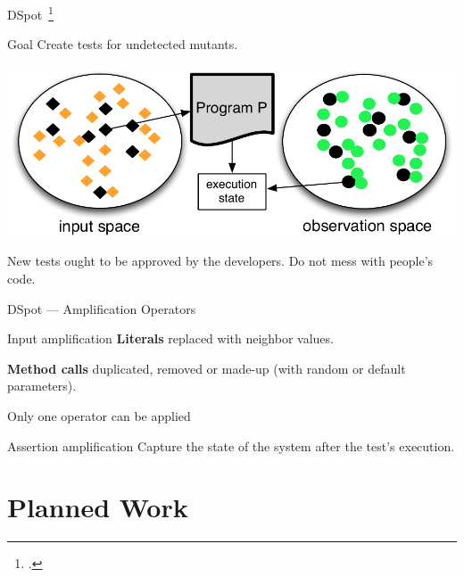 \documentclass{beamer}
\begin{document}
\begin{frame}{DSpot~\footcite{baudry2015dspot}}
  \begin{block}{Goal}
    Create tests for undetected mutants.
  \end{block}
  \begin{center}
    \includegraphics[scale=0.45]{io-spaces.pdf}

  \end{center}
  \pause{}
  \alert{New tests ought to be approved by the developers.}
  Do not mess with people's code.
\end{frame}

\begin{frame}{DSpot --- Amplification Operators}
  \begin{block}{Input amplification}
    \textbf{Literals \textrightarrow{}} replaced with neighbor values.

    \textbf{Method calls \textrightarrow{}} duplicated, removed or made-up (with random or default parameters).

    \pause{}
    \small{Only one operator can be applied}
  \end{block}

  \vfill
  \pause{}

  \begin{block}{Assertion amplification}
    Capture the state of the system after the test's execution.
  \end{block}
\end{frame}


\section{Planned Work}
\end{document}
